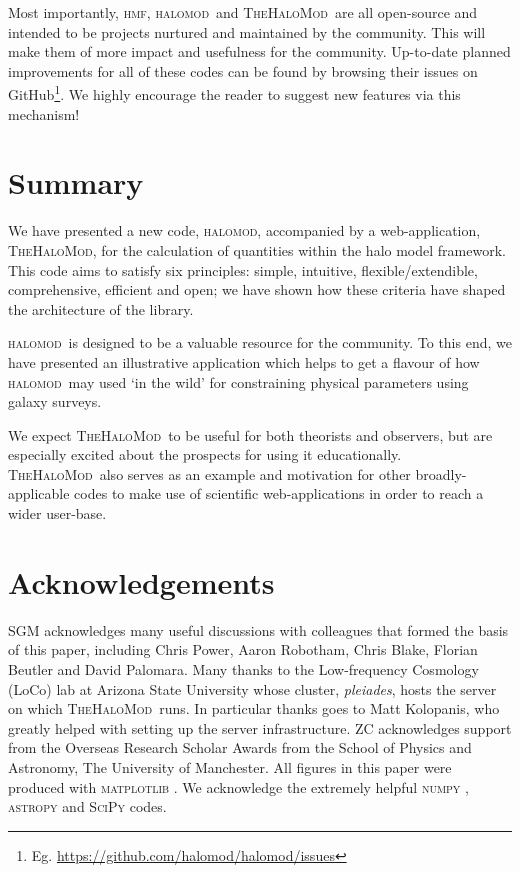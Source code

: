\documentclass[5p,aas_macros]{elsarticle}
\newcommand{\halomod}{\textsc{halomod}\xspace} %
\newcommand{\thm}{\textsc{TheHaloMod}\xspace} %
\newcommand{\hmf}{\textsc{hmf}\xspace} %
\providecommand{\DIFaddtex}[1]{{\protect\color{blue}\uwave{#1}}} %
\providecommand{\DIFaddbegin}{} %
\providecommand{\DIFaddend}{} %
\providecommand{\DIFdelbegin}{} %
\providecommand{\DIFdelend}{} %
\providecommand{\DIFadd}[1]{\texorpdfstring{\DIFaddtex{#1}}{#1}} %
\begin{document}
Most importantly, \hmf, \halomod\ and \thm\ are all open-source and intended to be projects nurtured and maintained by the community. 
This will make them of more impact and usefulness for the community.
Up-to-date planned improvements for all of these codes can be found by browsing their issues on GitHub\footnote{Eg. \DIFdelbegin %
\DIFdelend \DIFaddbegin \url{https://github.com/halomod/halomod/issues}\DIFaddend }. We highly encourage the reader to suggest new features via this mechanism!


\section{Summary}
\label{sec:summary}
We have presented a new code, \halomod, accompanied by a web-application, \thm, for the calculation of quantities within the halo model framework. This code aims to satisfy six principles: simple, intuitive, flexible/extendible, comprehensive, efficient and open; we have shown how these criteria have shaped the architecture of the library.

\halomod\  is designed to be a valuable resource for the community. 
To this end, we have presented an illustrative application which helps to get a flavour of how \halomod\ may \DIFaddbegin \DIFadd{be }\DIFaddend used `in the wild' for constraining physical parameters using galaxy surveys.

We expect \thm\ to be useful for both theorists and observers, but are especially excited about the prospects for using it educationally. 
\thm\ also serves as an example and motivation for other broadly-applicable codes to make use of scientific web-applications in order to reach a wider user-base.

\section*{Acknowledgements}
SGM acknowledges many useful discussions with colleagues that formed the basis of this paper, including Chris Power, Aaron Robotham, Chris Blake, Florian Beutler and David Palomara. 
Many thanks to the Low-frequency Cosmology (LoCo) lab at Arizona State University whose cluster, \textit{pleiades}, hosts the server on which \thm\ runs. In particular thanks goes to Matt Kolopanis, who greatly helped with setting up the server infrastructure.
ZC acknowledges support from the Overseas Research Scholar Awards from the School of Physics and Astronomy, The University of Manchester.
All figures in this paper were produced with \textsc{matplotlib} \citep{Hunter2007}. We acknowledge the extremely helpful \textsc{numpy} \citep{vanderWalt2011}, \textsc{astropy} \citep{Robitaille2013,AstropyCollaboration2018} and \textsc{SciPy} \citep{Virtanen2020} codes.
\end{document}
